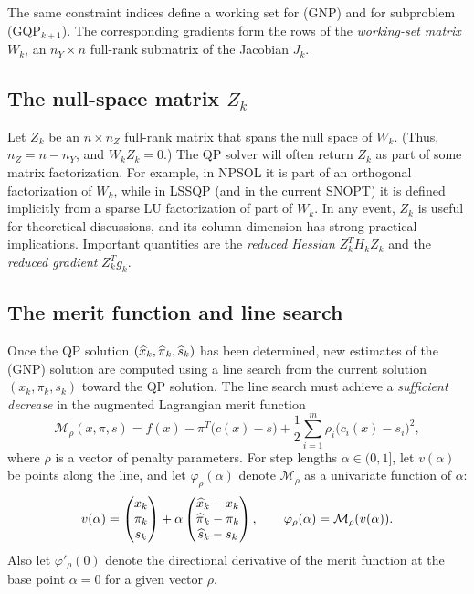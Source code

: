 \documentclass[draft,leqno,onefignum,onetabnum]{siamltex}
\def\half  {{\textstyle{\frac12}}}
\def\kp#1{_{k+#1}}
\def\Mscr{{\mathcal M}}
\def\pihat{\skew1\widehat \pi}
\def\shat{\widehat s}
\def\T{^T\!}
\def\xhat{\skew{2.8}\widehat x}
\def\Y{_{\scriptscriptstyle Y}}
\def\Z{_{\scriptscriptstyle Z}}
\def\Jk{J_k}
\def\LSSQP {{\small LSSQP}}
\def\NPSOL {{\small NPSOL}}
\def\SNOPT {{\small SNOPT}}
\newcommand{\pmat}[1]{\begin{pmatrix}#1\end{pmatrix}}
\begin{document}
The same constraint indices define a working set for (GNP)
and for subproblem (GQP$\kp1$).  The corresponding gradients
form the rows of the \emph{working-set matrix} $W_k$,
an $n\Y \!\times n$ full-rank submatrix of the Jacobian $\Jk$.


 \subsection{The null-space matrix \protect\boldmath$Z_k$} \label{sec-Z}

Let $Z_k$ be an $n\times n\Z$ full-rank matrix that spans
the null space of $W_k$.  (Thus, $n\Z = n - n\Y$, and $W_k Z_k =0$.)
The QP solver will often return $Z_k$ as part of some
matrix factorization.  For example, in \NPSOL{} it is part of an
orthogonal factorization of $W_k$, while in \LSSQP{} \cite{Eld91}
(and in the current \SNOPT) it is defined implicitly from a sparse LU
factorization of part of $W_k$.
In any event, $Z_k$ is useful for theoretical discussions,
and its column dimension has strong practical implications.
Important quantities are the \emph{reduced Hessian} $Z_k\T H_k Z_k$
and the \emph{reduced gradient} $Z_k\T g_k$.


 \subsection{The merit function and line search}  \label{sec-merit}

 Once the QP solution $(\xhat_k,\pihat_k,\shat_k)$ has been
determined, new estimates of the (GNP) solution are computed using a line
search from the current solution $(x_k,\pi_k,s_k)$ toward the
QP solution.  The line search must achieve a \emph{sufficient decrease}
in the augmented Lagrangian merit function
\begin{equation}                              \label{eqn-def-merit}
        \Mscr_\rho(x,\pi,s)
          = f(x) - \pi\T \bigl( c(x) - s \bigr)
            + \half \sum_{i=1}^m \rho_i\big( c_i(x) - s_i\big)^2,
\end{equation}
where $\rho$ is a vector of penalty parameters.
For step lengths $\alpha \in (0,1]$, let $v(\alpha)$ be points
along the line, and let $\varphi_\rho(\alpha)$ denote $\Mscr_\rho$
as a univariate function of $\alpha$:
\begin{equation*}                               \label{eqn-def-newvars}
   v(\alpha) = \pmat{ x_k   \\ \pi_k   \\ s_k   }
        + \alpha \pmat{  \xhat_k -  x_k
                     \\ \pihat_k -\pi_k
                     \\  \shat_k -  s_k },
      \qquad
   \varphi_\rho(\alpha) = \Mscr_\rho(v(\alpha)).
\end{equation*}
Also let $\varphi'_\rho(0)$ denote the
directional derivative of the merit function at the
base point $\alpha = 0$ for a given vector $\rho$.
\end{document}
